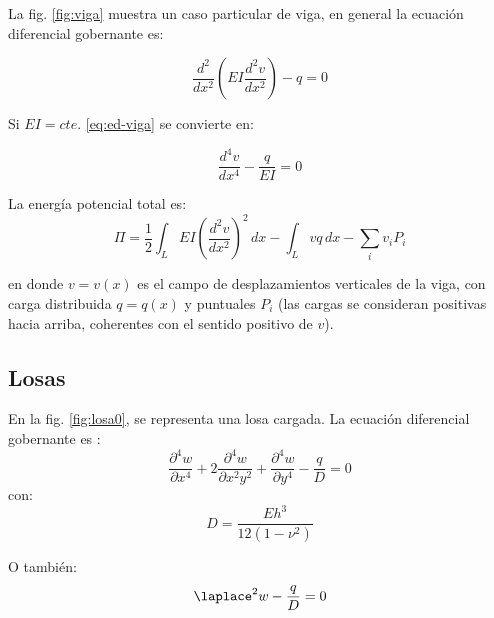 La fig. \ref{fig:viga} muestra un caso particular de viga, en general la ecuación diferencial gobernante es:

\begin{equation}
	\dfrac{d^2}{dx^2} \left( EI \dfrac{d^2v}{dx^2}\right) - q = 0
	\label{eq:ed-viga}
\end{equation}


Si $EI = cte.$ \eqref{eq:ed-viga} se convierte en:

\begin{equation}
	\dfrac{d^4v}{dx^4} - \dfrac{q}{EI} = 0
	\label{eq:ed-viga-cte}
\end{equation}

La energía potencial total es:
\begin{equation}
	\Pi = \frac{1}{2} \int_L EI \left(\frac{d^2v}{dx^2}\right)^2 \, dx - \int_L vq \, dx - \sum_i v_iP_i
	\label{eq:energia-vigas}
\end{equation}

en donde $v = v(x)$ es el campo de desplazamientos verticales de la viga, con carga 
distribuida $q = q(x)$ y puntuales $P_i$ (las cargas se consideran positivas hacia 
arriba, coherentes con el sentido positivo de $v$).

\subsection{Losas}

En la fig. \ref{fig:losa0}, se representa una losa cargada. La ecuación diferencial gobernante es \cite{timoshenko1959theory}:
\begin{equation}
	 \dfrac{\partial^4 w}{\partial x^4} + 2\dfrac{\partial^4 w}{\partial x^2y^2} + \dfrac{\partial^4 w}{\partial y^4} - \dfrac{q}{D} = 0
\end{equation}
con:
\begin{equation}
	D = \dfrac{Eh^3}{12 (1 - \nu^2)}
\end{equation}

O también:
\begin{equation}
	\laplace^2 w - \dfrac{q}{D} = 0
\end{equation}

